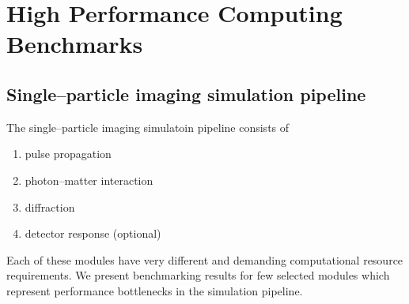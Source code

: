 \documentclass[10pt]{scrartcl}
\begin{document}
\section{High Performance Computing Benchmarks}
\subsection{Single--particle imaging simulation pipeline}
The single--particle imaging simulatoin pipeline consists of
%
\begin{enumerate}
  \item pulse propagation
  \item photon--matter interaction
  \item diffraction
  \item detector response (optional)
\end{enumerate}
%
Each of these modules have very different and demanding computational resource
requirements. We present benchmarking results for few selected modules which
represent performance bottlenecks in the simulation pipeline.
%
\end{document}
